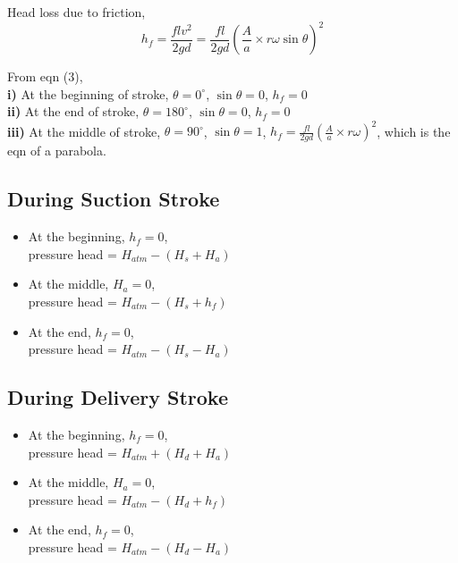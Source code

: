 \documentclass{article}
\begin{document}
\begin{multicols}{2}
      Head loss due to friction,
      \begin{equation}
        h_f = \frac{f l v^2}{2  g d} = \frac{f l}{2 g d} \left( \frac{A}{a} \times r \omega \sin \theta \right)^2
      \end{equation}

      From eqn (3),\\ 
      \textbf{i)} At the beginning of stroke, $\theta = 0^{\circ}$, $\sin \theta = 0$, $h_f = 0$ \\
      \textbf{ii)} At the end of stroke, $\theta = 180^{\circ}$, $\sin \theta = 0$, $h_f = 0$ \\
      \textbf{iii)} At the middle of stroke, $\theta = 90^{\circ}$, $\sin \theta = 1$, $h_f = \frac{f l}{2 g d} \left( \frac{A}{a} \times r \omega \right)^2$, which is the eqn of a parabola. \\

      \subsection*{During Suction Stroke}
      \begin{itemize}
        \item At the beginning, $h_f = 0$, \\pressure head = $H_{atm} - \left(H_s + H_a\right)$
        \item At the middle, $H_a = 0$, \\pressure head = $H_{atm} - \left(H_s + h_f\right)$
        \item At the end, $h_f = 0$, \\pressure head = $H_{atm} - \left(H_s - H_a\right)$
      \end{itemize}

      \subsection*{During Delivery Stroke}
      \begin{itemize}
        \item At the beginning, $h_f = 0$, \\pressure head = $H_{atm} + \left(H_d + H_a\right)$
        \item At the middle, $H_a = 0$, \\pressure head = $H_{atm} - \left(H_d + h_f\right)$
        \item At the end, $h_f = 0$, \\pressure head = $H_{atm} - \left(H_d - H_a\right)$
      \end{itemize}


\end{multicols}
\end{document}
